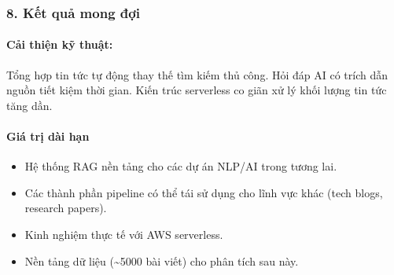 \hypertarget{kux1ebft-quux1ea3-mong-ux111ux1ee3i}{%
\subsubsection{8. Kết quả mong
đợi}}

\hypertarget{cux1ea3i-thiux1ec7n-kux1ef9-thuux1eadt}{%
\paragraph{Cải thiện kỹ
thuật:}}

Tổng hợp tin tức tự động thay thế tìm kiếm thủ công. Hỏi đáp AI có trích
dẫn nguồn tiết kiệm thời gian. Kiến trúc serverless co giãn xử lý khối
lượng tin tức tăng dần.

\hypertarget{giuxe1-trux1ecb-duxe0i-hux1ea1n}{%
\paragraph{Giá trị dài hạn}}

\begin{itemize}
\tightlist
\item
  Hệ thống RAG nền tảng cho các dự án NLP/AI trong tương lai.
\item
  Các thành phần pipeline có thể tái sử dụng cho lĩnh vực khác (tech
  blogs, research papers).
\item
  Kinh nghiệm thực tế với AWS serverless.
\item
  Nền tảng dữ liệu (\textasciitilde5000 bài viết) cho phân tích sau này.
\end{itemize}
